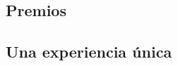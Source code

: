 \subsection{Premios}
\begin{frame}
\end{frame}

\subsection{Una experiencia única}
\begin{frame}
\end{frame}